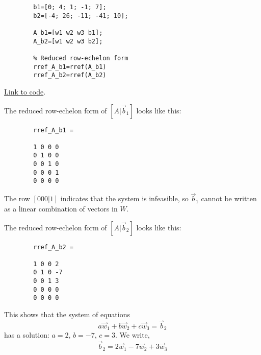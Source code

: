 \documentclass{ximera}
\begin{document}
\begin{example}
\begin{explanation}
\begin{verbatim}
        b1=[0; 4; 1; -1; 7];
        b2=[-4; 26; -11; -41; 10];

        A_b1=[w1 w2 w3 b1];
        A_b2=[w1 w2 w3 b2];

        % Reduced row-echelon form
        rref_A_b1=rref(A_b1)
        rref_A_b2=rref(A_b2)
    \end{verbatim}

\href{https://sagecell.sagemath.org/?z=eJxNkD9vgzAQxXckvsNbkBqpVLFJ08Fi6N6pSwdURfw5AhLgyjax-u17F9K0g63n37t7ti_DGwW8nhqFeulEaDSEej3PtATqMNfBjS15pEmGOFhPaO20zotH7QhhIFyoDdZ52B4fUhXsmZg7xDEMd_d2Q6Mf4ch_MR0vNH0_pUmaRFVWhcHR5Mpgb3D4NAx1WfEx1wbsPRuoKy3K6rfqZgpOk4YzNihNvF6ENxySM9NHgeIceFP7rUf-XVZRIWrEgp8oWGbwH-qtNsM7dWvLI3E25tQONNkFvXVzmjhH_ekaJupB1O6P6jvVux-ACGWM&lang=octave&interacts=eJyLjgUAARUAuQ==}{Link to code}.

The reduced row-echelon form of $[A | \vec{b}_1]$ looks like this:
    \begin{verbatim}
        rref_A_b1 =

        1 0 0 0
        0 1 0 0
        0 0 1 0
        0 0 0 1
        0 0 0 0
    \end{verbatim}

The row $[0 0 0 | 1]$ indicates that the system is infeasible, so $\vec{b}_1$ cannot be written as a linear combination of vectors in $W$.

The reduced row-echelon form of $[A | \vec{b}_2]$ looks like this:

    \begin{verbatim}
        rref_A_b2 =

        1 0 0 2
        0 1 0 -7
        0 0 1 3
        0 0 0 0
        0 0 0 0
    \end{verbatim}
This shows that the system of equations
$$a\vec{w}_1+b\vec{w}_2+c\vec{w}_3=\vec{b}_2$$
has a solution: $a=2$, $b=-7$, $c=3$.  We write,
$$\vec{b}_2=2\vec{w}_1-7\vec{w}_2+3\vec{w}_3$$
    \end{explanation}

\end{example}
\end{document}
